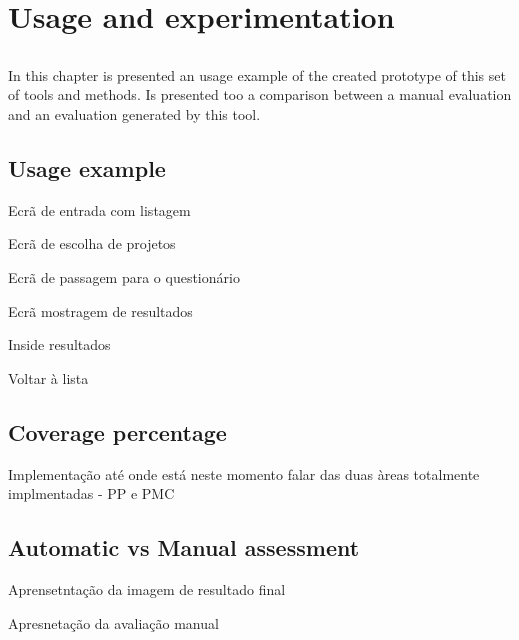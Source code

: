 \chapter{Usage and experimentation} \label{chap:usage}

\section*{}

In this chapter is presented an usage example of the created prototype of this set of tools and methods. Is presented too a comparison between a manual evaluation and an evaluation generated by this tool.

\section{Usage example} \label{sec:usageexample}

Ecrã de entrada com listagem

Ecrã de escolha de projetos

Ecrã de passagem para o questionário

Ecrã mostragem de resultados

Inside resultados

Voltar à lista

\section{Coverage percentage} \label{sec:coverage}


Implementação até onde está neste momento falar das duas àreas totalmente implmentadas - PP e PMC
	
\section{Automatic vs Manual assessment} \label{sec:automatic}

Aprensetntação da imagem de resultado final

Apresnetação da avaliação manual